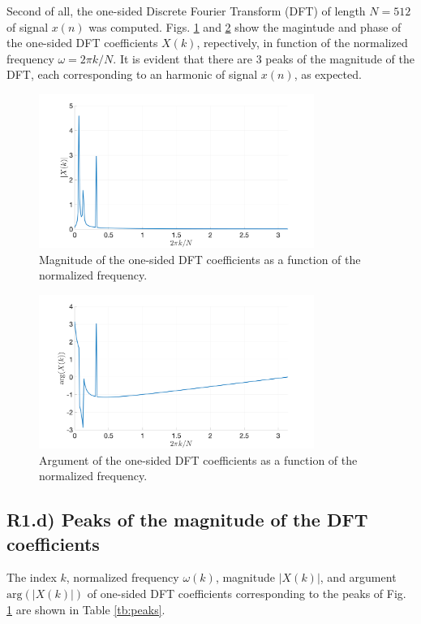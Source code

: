 \documentclass[]{scrartcl}
\begin{document}
Second of all, the one-sided Discrete Fourier Transform (DFT) of length $N= 512$ of signal $x(n)$ was computed. Figs. \ref{fig:R1c_mag} and \ref{fig:R1c_arg} show the magintude and phase of the one-sided DFT coefficients $X(k)$, repectively, in function of the normalized frequency $\omega = 2\pi k/N$. It is evident that there are 3 peaks of the magnitude of the DFT, each corresponding to an harmonic of signal $x(n)$, as expected.

\begin{figure}[htbp]
	\centering
	\includegraphics[width= 0.8\textwidth]{figures/R1c_mag.png}
	\caption{Magnitude of the one-sided DFT coefficients as a function of the normalized frequency.}
	\label{fig:R1c_mag}
\end{figure}
\begin{figure}[htbp]
	\centering
	\includegraphics[width= 0.8\textwidth]{figures/R1c_arg.png}
	\caption{Argument of the one-sided DFT coefficients as a function of the normalized frequency.}
	\label{fig:R1c_arg}
\end{figure}

\subsection{R1.d) Peaks of the magnitude of the DFT coefficients}
The index $k$, normalized frequency $\omega(k)$, magnitude $|X(k)|$, and argument $\mathrm{arg}(|X(k)|)$ of one-sided DFT coefficients corresponding to the peaks of Fig. \ref{fig:R1c_mag} are shown in Table \ref{tb:peaks}.
\end{document}
